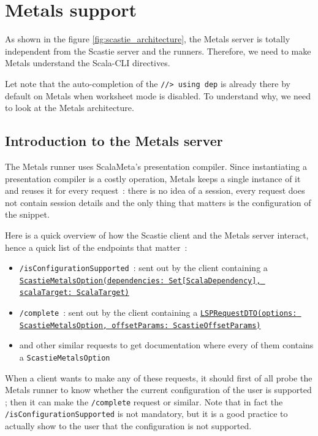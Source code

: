 \documentclass{article}
\begin{document}
\section{Metals support}

As shown in the figure \ref{fig:scastie_architecture}, the Metals server is totally independent from the Scastie server and the runners. Therefore, we need to make Metals understand the Scala-CLI directives.

Let note that the auto-completion of the \lstinline{//> using dep} is already there by default on Metals when worksheet mode is disabled. To understand why, we need to look at the Metals architecture.

\subsection{Introduction to the Metals server}

The Metals runner uses ScalaMeta's presentation compiler. Since instantiating a presentation compiler is a costly operation, Metals keeps a single instance of it and reuses it for every request~: there is no idea of a session, every request does not contain session details and the only thing that matters is the configuration of the snippet.

Here is a quick overview of how the Scastie client and the Metals server interact, hence a quick list of the endpoints that matter~:

\begin{itemize}
    \item \lstinline{/isConfigurationSupported}~: sent out by the client containing a \href{https://github.com/Maeeen/scastie/blob/main/api/src/main/scala/com.olegych.scastie.api/ApiModels.scala#LL132C101-L132C101}{\lstinline{ScastieMetalsOption(dependencies: Set[ScalaDependency], scalaTarget: ScalaTarget)}}
    
    \item \lstinline{/complete}~: sent out by the client containing a \href{https://github.com/Maeeen/scastie/blob/23e0fa998565a37d8ecfa36fa64d1268a9c1d12c/api/src/main/scala/com.olegych.scastie.api/ApiModels.scala#L169}{\lstinline{LSPRequestDTO(options: ScastieMetalsOption, offsetParams: ScastieOffsetParams)}}
    \item and other similar requests to get documentation where every of them contains a \lstinline{ScastieMetalsOption}
\end{itemize}

When a client wants to make any of these requests, it should first of all probe the Metals runner to know whether the current configuration of the user is supported ; then it can make the \lstinline{/complete} request or similar. Note that in fact the \lstinline{/isConfigurationSupported} is not mandatory, but it is a good practice to actually show to the user that the configuration is not supported.
\end{document}
